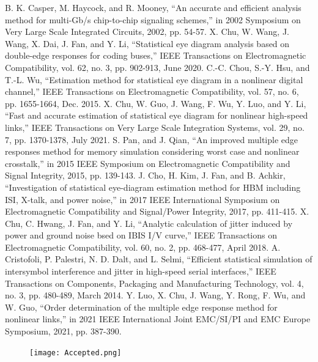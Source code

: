 \documentclass[conference]{IEEEtran}
\begin{document}
\begin{thebibliography}{00}
 B. K. Casper, M. Haycock, and R. Mooney, ``An accurate and efficient analysis method for multi-Gb/s chip-to-chip signaling schemes,'' in 2002 Symposium on Very Large Scale Integrated Circuits, 2002, pp. 54-57.
 X. Chu, W. Wang, J. Wang, X. Dai, J. Fan, and Y. Li, ``Statistical eye diagram analysis based on double-edge responses for coding buses,'' IEEE Transactions on Electromagnetic Compatibility, vol. 62, no. 3, pp. 902-913, June 2020.
 C.-C. Chou, S.-Y. Hsu, and T.-L. Wu, ``Estimation method for statistical eye diagram in a nonlinear digital channel,'' IEEE Transactions on Electromagnetic Compatibility, vol. 57, no. 6, pp. 1655-1664, Dec. 2015.
 X. Chu, W. Guo, J. Wang, F. Wu, Y. Luo, and Y. Li, ``Fast and accurate estimation of statistical eye diagram for nonlinear high-speed links,'' IEEE Transactions on Very Large Scale Integration Systems, vol. 29, no. 7, pp. 1370-1378, July 2021.
 S. Pan, and J. Qian, ``An improved multiple edge responses method for memory simulation considering worst case and nonlinear crosstalk,'' in 2015 IEEE Symposium on Electromagnetic Compatibility and Signal Integrity, 2015, pp. 139-143.
 J. Cho, H. Kim, J. Fan, and B. Achkir, ``Investigation of statistical eye-diagram estimation method for HBM including ISI, X-talk, and power noise,'' in 2017 IEEE International Symposium on Electromagnetic Compatibility and Signal/Power Integrity, 2017, pp. 411-415.
 X. Chu, C. Hwang, J. Fan, and Y. Li, ``Analytic calculation of jitter induced by power and ground noise bsed on IBIS I/V curve,'' IEEE Transactions on Electromagnetic Compatibility, vol. 60, no. 2, pp. 468-477, April 2018.
 A. Cristofoli, P. Palestri, N. D. Dalt, and L. Selmi, ``Efficient statistical simulation of intersymbol interference and jitter in high-speed serial interfaces,'' IEEE Transactions on Components, Packaging and Manufacturing Technology, vol. 4, no. 3, pp. 480-489, March 2014.
 Y. Luo, X. Chu, J. Wang, Y. Rong, F. Wu, and W. Guo, ``Order determination of the multiple edge response method for nonlinear links,'' in 2021 IEEE International Joint EMC/SI/PI and EMC Europe Symposium, 2021, pp. 387-390.
\end{thebibliography}

\begin{figure}[t]
\centerline{\texttt{[image: Accepted.png]}}
\end{figure}
\end{document}
